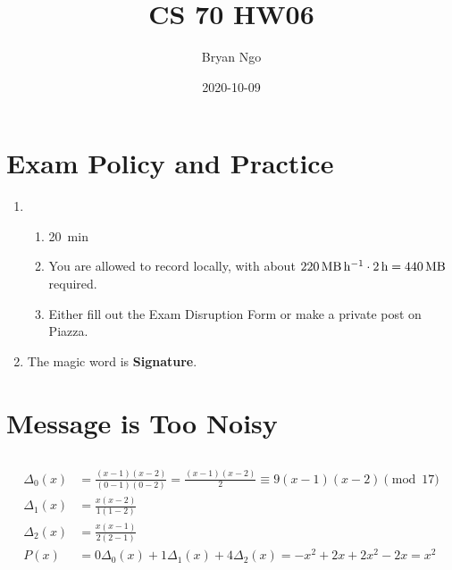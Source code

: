 \documentclass{article}
\title{CS 70 HW06}
\author{Bryan Ngo}
\date{2020-10-09}
\begin{document}
\maketitle

\section{Exam Policy and Practice}

\begin{enumerate}
    \item \begin{enumerate}
        \item \SI{20}{\minute}
        \item You are allowed to record locally, with about \(\SI{220}{\mega\byte\per\hour} \cdot \SI{2}{\hour} = \SI{440}{\mega\byte}\) required.
        \item Either fill out the Exam Disruption Form or make a private post on Piazza.
    \end{enumerate}
    \item The magic word is \textbf{Signature}.
\end{enumerate}

\section{Message is Too Noisy}

\subsection{}

\begin{align}
    \Delta_0(x) &= \frac{(x - 1) (x - 2)}{(0 - 1) (0 - 2)} = \frac{(x - 1) (x - 2)}{2} \equiv 9 (x - 1) (x - 2) \pmod{17} \\
    \Delta_1(x) &= \frac{x (x - 2)}{1 (1 - 2)} \\
    \Delta_2(x) &= \frac{x (x - 1)}{2 (2 - 1)} \\
    P(x) &= 0 \Delta_0(x) + 1 \Delta_1(x) + 4 \Delta_2(x) = -x^2 + 2x + 2x^2 - 2x = x^2
\end{align}

\subsection{}
\end{document}
